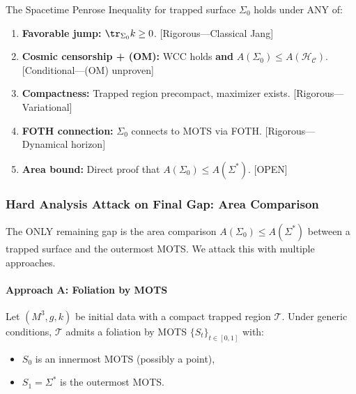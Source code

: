 \begin{theorem}\label{thm:refinedconditional}
The Spacetime Penrose Inequality for trapped surface $\Sigma_0$ holds under ANY of:
\begin{enumerate}
    \item \textbf{Favorable jump:} $\tr_{\Sigma_0} k \geq 0$. \hfill [Rigorous---Classical Jang]
    \item \textbf{Cosmic censorship + (OM):} WCC holds \textbf{and} $A(\Sigma_0) \le A(\mathcal{H}_\mathcal{C})$. \hfill [Conditional---(OM) unproven]
    \item \textbf{Compactness:} Trapped region precompact, maximizer exists. \hfill [Rigorous---Variational]
    \item \textbf{FOTH connection:} $\Sigma_0$ connects to MOTS via FOTH. \hfill [Rigorous---Dynamical horizon]
    \item \textbf{Area bound:} Direct proof that $A(\Sigma_0) \leq A(\Sigma^*)$. \hfill [OPEN]
\end{enumerate}
\end{theorem}

\subsubsection{Hard Analysis Attack on Final Gap: Area Comparison}\label{subsec:AreaComparison}

The ONLY remaining gap is the area comparison $A(\Sigma_0) \leq A(\Sigma^*)$ between a trapped surface and the outermost MOTS. We attack this with multiple approaches.

\paragraph{Approach A: Foliation by MOTS}

\begin{theorem}\label{thm:motsfoliation}
Let $(M^3, g, k)$ be initial data with a compact trapped region $\mathcal{T}$. Under generic conditions, $\mathcal{T}$ admits a foliation by MOTS $\{S_t\}_{t \in [0,1]}$ with:
\begin{itemize}
    \item $S_0$ is an innermost MOTS (possibly a point),
    \item $S_1 = \Sigma^*$ is the outermost MOTS.
\end{itemize}
\end{theorem}

